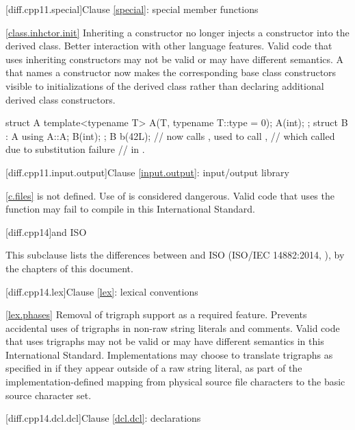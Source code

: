 [diff.cpp11.special]{Clause \ref{special}: special member functions}

\ref{class.inhctor.init}
\change
Inheriting a constructor no longer injects a constructor into the derived class.
\rationale
Better interaction with other language features.
\effect
Valid \CppXIV code that uses inheriting constructors may not be valid
or may have different semantics. A 
that names a constructor now makes the corresponding base class constructors
visible to initializations of the derived class
rather than declaring additional derived class constructors.
\begin{codeblock}
struct A {
  template<typename T> A(T, typename T::type = 0);
  A(int);
};
struct B : A {
  using A::A;
  B(int);
};
B b(42L); // now calls , used to call ,
          // which called  due to substitution failure
          // in .
\end{codeblock}

[diff.cpp11.input.output]{Clause \ref{input.output}: input/output library}

\ref{c.files}
\change {} is not defined.
\rationale Use of  is considered dangerous.
\effect
Valid \CppXI code that uses the  function may fail to compile
in this International Standard.

[diff.cpp14]{\Cpp and ISO \CppXIV}

\pnum
{}%
This subclause lists the differences between \Cpp and
ISO \CppXIV (ISO/IEC 14882:2014, ),
by the chapters of this document.

[diff.cpp14.lex]{Clause \ref{lex}: lexical conventions}

\ref{lex.phases}
%
\change Removal of trigraph support as a required feature.
\rationale Prevents accidental uses of trigraphs in non-raw string literals and comments.
\effect
Valid \CppXIV code that uses trigraphs may not be valid or may have different
semantics in this International Standard. Implementations may choose to
translate trigraphs as specified in \CppXIV if they appear outside of a raw
string literal, as part of the implementation-defined mapping from physical
source file characters to the basic source character set.

[diff.cpp14.dcl.dcl]{Clause \ref{dcl.dcl}: declarations}

